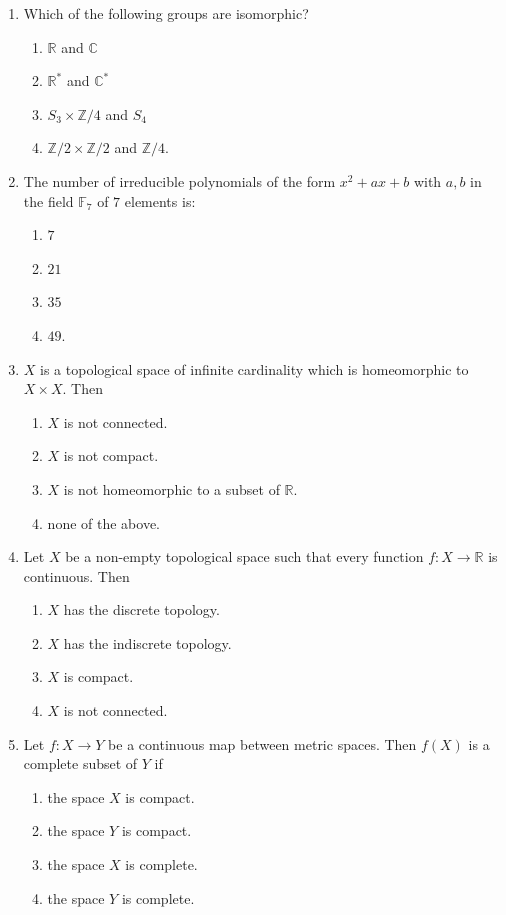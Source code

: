 \documentclass[11pt, a4paper]{article}
\begin{document}
\begin{enumerate}[resume]
  \item Which of the following groups are isomorphic?
  \begin{enumerate}[label=\Alph*.]
    \item $\mathbb{R}$ and $\mathbb{C}$
    \item $\mathbb{R}^*$ and $\mathbb{C}^*$
    \item $S_3 \times \mathbb{Z}/4$ and $S_4$
    \item $\mathbb{Z}/2 \times \mathbb{Z}/2$ and $\mathbb{Z}/4$.
  \end{enumerate}

  \item The number of irreducible polynomials of the form $x^2 + ax + b$ with $a, b$ in the field $\mathbb{F}_7$ of $7$ elements is:
  \begin{enumerate}[label=\Alph*.]
    \item $7$
    \item $21$
    \item $35$
    \item $49$.
  \end{enumerate}

  \item $X$ is a topological space of infinite cardinality which is homeomorphic to $X \times X$. Then
  \begin{enumerate}[label=\Alph*.]
    \item $X$ is not connected.
    \item $X$ is not compact.
    \item $X$ is not homeomorphic to a subset of $\mathbb{R}$.
    \item none of the above.
  \end{enumerate}

  \item Let $X$ be a non-empty topological space such that every function $f: X \to \mathbb{R}$ is continuous. Then
  \begin{enumerate}[label=\Alph*.]
    \item $X$ has the discrete topology.
    \item $X$ has the indiscrete topology.
    \item $X$ is compact.
    \item $X$ is not connected.
  \end{enumerate}

  \item Let $f: X \to Y$ be a continuous map between metric spaces. Then $f(X)$ is a complete subset of $Y$ if
  \begin{enumerate}[label=\Alph*.]
    \item the space $X$ is compact.
    \item the space $Y$ is compact.
    \item the space $X$ is complete.
    \item the space $Y$ is complete.
  \end{enumerate}


\end{enumerate}
\end{document}
